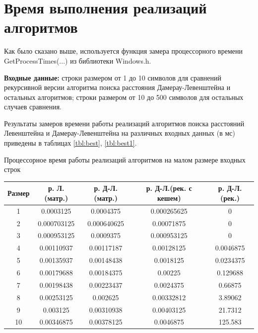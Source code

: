 \section{Время выполнения реализаций алгоритмов}

Как было сказано выше, используется функция замера процессорного времени GetProcessTimes(...) из библиотеки Windows.h. 

\textbf{Входные данные:} строки размером от 1 до 10 символов для сравнений рекурсивной версии алгоритма поиска расстояния Дамерау-Левенштейна и остальных алгоритмов; строки размером от 10 до 500 символов для остальных случаев сравнения.

Результаты замеров времени работы реализаций алгоритмов поиска расстояний Левенштейна и Дамерау-Левенштейна на различных входных данных (в мс) приведены в таблицах \ref{tbl:best}, \ref{tbl:best1}.
\begin{center}
	\begin{threeparttable}
		\caption{Процессорное время работы реализаций алгоритмов на малом размере входных строк}
		\label{tbl:best}
		\begin{tabular}{|c|c|c|c|c|}
			\hline
			Размер &р. Л.(матр.) &р. Д-Л.(матр.)  &р. Д-Л.(рек. с кешем)& р. Д-Л.(рек.)\\
			\hline
			1 &  0.0003125  &    0.0004375    &0.000265625 &             0\\
			\hline
			2 &  0.000703125 &   0.000640625    & 0.00071875&              0\\
		\hline
			3 &  0.000953125  &    0.0009375   & 0.000953125 &             0\\
		\hline
			4 & 0.00110937     &0.00117187    & 0.00128125    &  0.0046875\\
		\hline
			5 &  0.00135937     &0.00148438      &0.0018125    &  0.0234375\\
		\hline
			6 & 0.00179688 &    0.00184375      &  0.00225      & 0.129688\\
		\hline
			7 &  0.00198438 &    0.00223437    &  0.0024375      &  0.66875\\
		\hline
			8 & 0.00253125   &    0.002625    & 0.00332812        &3.89062\\
		\hline
			9 & 0.003125 &    0.00310938     &0.00403125      &  21.7312\\
		\hline
			10 & 0.00346875 &    0.00378125 &     0.0046875    &    125.583\\
		\hline
		\end{tabular}
		
	\end{threeparttable}
\end{center}

